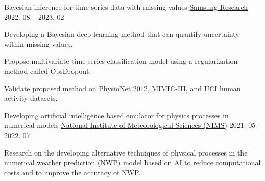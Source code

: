 \documentclass[11pt, a4paper]{cv}
\begin{document}
\begin{cventries}

  \cvproject
    {Bayesian inference for time-series data with missing values} %
    {\href{https://research.samsung.com}{Samsung Research}} %
    {2022. 08 -- 2023. 02} %
    {
      \begin{cvitems} %
        \item {Developing a Bayesian deep learning method that can quantify uncertainty within missing values.}
        \item {Propose multivariate time-series classification model using a regularization method called ObsDropout.}
        \item {Validate proposed method on PhysioNet 2012, MIMIC-III, and UCI human activity datasets.}
      \end{cvitems}
    }

  \cvproject
    {Developing artificial intelligence based emulator for physics processes in numerical models} %
    {\href{http://www.nims.go.kr/AE/MA/main.jsp}{National Institute of Meteorological Sciences (NIMS)}} %
    {2021. 05 - 2022. 07} %
    {
      \begin{cvitems} %
        \item {Research on the developing alternative techniques of physical processes in the numerical weather prediction (NWP) model based on AI to reduce computational costs and to improve the accuracy of NWP.}
      \end{cvitems}
    }

\end{cventries}





\end{document}

